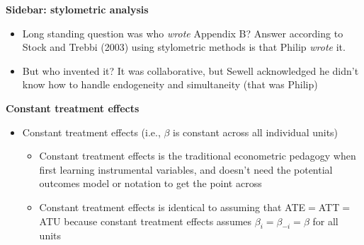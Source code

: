 \documentclass[notes=show]{beamer}
\begin{document}
\begin{frame}[plain]
\begin{center}
\textbf{Sidebar: stylometric analysis}
\end{center}

\begin{itemize}
\item Long standing question was who \emph{wrote} Appendix B? Answer according to Stock and Trebbi (2003) using stylometric methods is that Philip \emph{wrote} it.
\item But who invented it?  It was collaborative, but Sewell acknowledged he didn't know how to handle endogeneity and simultaneity (that was Philip)
\end{itemize}

\end{frame}


\begin{frame}[plain]

	\begin{center}
	\textbf{Constant treatment effects}
	\end{center}

		\begin{itemize}
		\item Constant treatment effects (i.e., $\beta$ is constant across all individual units)
			\begin{itemize}
			\item Constant treatment effects is the traditional econometric pedagogy when first learning instrumental variables, and doesn't need the potential outcomes model or notation to get the point across
			\item Constant treatment effects is identical to assuming that ATE$=$ATT$=$ATU because constant treatment effects assumes $\beta_i=\beta_{-i}=\beta$ for all units
			\end{itemize}
		\end{itemize}

\end{frame}
\end{document}
